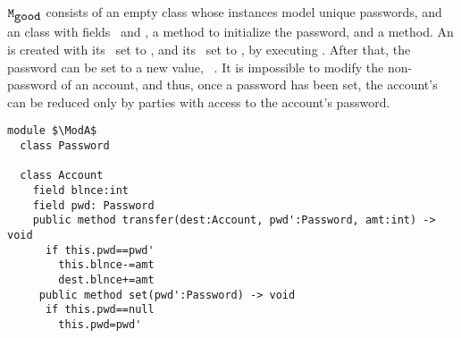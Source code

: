 {%
$\mbox{\normalfont{\texttt{M}}}_{\mbox{\normalfont{\texttt{good}}}}$ consists of an empty class   whose instances model  unique passwords}, and an  class with fields  \password~and  \balance, a  method to initialize the password, and  a  method. 
An  is created with its \balance~set to , and its \password~set to , \eg by executing .
 After that, the password can be set to a new value,  \eg\,   . 
It is impossible to modify the  non- password of an account, and thus, once a password has been set, the account's {can be reduced only 
by parties with access to the account's password.}
 

\begin{lstlisting}[mathescape=true, language=Chainmail, frame=lines]
module $\ModA$        
  class Password
  
  class Account
    field blnce:int 
    field pwd: Password
    public method transfer(dest:Account, pwd':Password, amt:int) -> void
      if this.pwd==pwd'
        this.blnce-=amt
        dest.blnce+=amt
     public method set(pwd':Password) -> void
      if this.pwd==null
        this.pwd=pwd'
\end{lstlisting}
%
\noindent 
%
 
